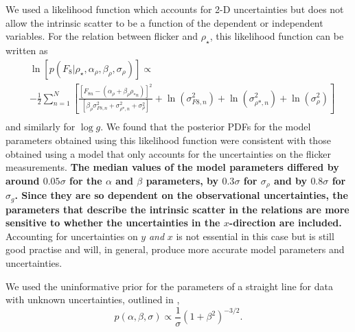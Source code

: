 \documentclass[apjl]{emulateapj}
\newcommand{\logg}{$\log g$}
\newcommand{\rhostar}{$\rho_{\star}$}
\begin{document}
We used a likelihood function which accounts for 2-D uncertainties but does
not allow the intrinsic scatter to be a function of the dependent or
independent variables.
For the relation between flicker and \rhostar, this likelihood function can be
written as
\begin{eqnarray}
	& \ln\left[p(F_8|\rho_\star, \alpha_\rho, \beta_\rho, \sigma_{\rho})\right]
        \propto  \\ \nonumber
    & -\frac{1}{2}\sum_{n=1}^N \left[\frac{[F_{8n}-(\alpha_\rho
    + \beta_\rho \rho_{*n})]^2}
	{\left[\beta_\rho \sigma_{F8, n}^2 + \sigma_{\rho *, n}^2 +
    \sigma_{\rho}^2\right]} + \ln(\sigma_{F8, n}^2) + \ln(\sigma_{\rho*, n}^2)
    + \ln(\sigma_\rho^2) \right]
	\\ \nonumber
\end{eqnarray}
\label{eq:likelihood}
and similarly for \logg.
We found that the posterior PDFs for the model parameters obtained using this
likelihood function were consistent with those obtained using a model that
only accounts for the uncertainties on the flicker measurements.
{\bf The median values of the model parameters differed by around $0.05
\sigma$ for the $\alpha$ and $\beta$ parameters, by $0.3 \sigma$ for
$\sigma_\rho$ and by $0.8 \sigma$ for $\sigma_g$.
Since they are so dependent on the observational uncertainties, the parameters
that describe the intrinsic scatter in the relations are more sensitive to
whether the uncertainties in the $x$-direction are included.}
Accounting for uncertainties on $y$ {\it and} $x$ is not essential in this
case but is still good practise and will, in general, produce more accurate
model parameters and uncertainties.


We used the uninformative prior for the parameters of a straight line for
data with unknown uncertainties, outlined in \citet{vanderplas},
\begin{equation}
p(\alpha, \beta, \sigma) \propto \frac{1}{\sigma} \left( 1 + \beta^2
\right)^{-3/2}.
\end{equation}
\label{eq:priors}

\end{document}
